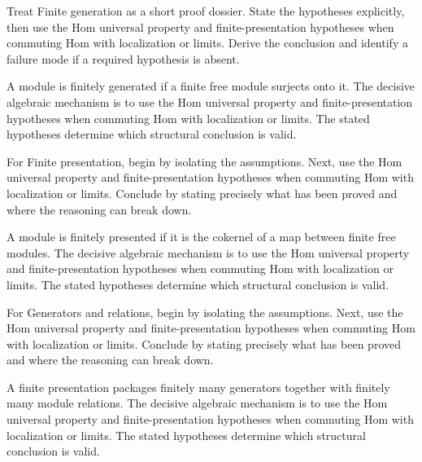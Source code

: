 \begin{problem}\label{prob:v12-problem-04}
Treat Finite generation as a short proof dossier. State the hypotheses explicitly, then use the Hom universal property and finite-presentation hypotheses when commuting Hom with localization or limits. Derive the conclusion and identify a failure mode if a required hypothesis is absent.
\end{problem}
\begin{solution}
A module is finitely generated if a finite free module surjects onto it. The decisive algebraic mechanism is to use the Hom universal property and finite-presentation hypotheses when commuting Hom with localization or limits. The stated hypotheses determine which structural conclusion is valid.
\end{solution}

\begin{problem}\label{prob:v12-problem-05}
For Finite presentation, begin by isolating the assumptions. Next, use the Hom universal property and finite-presentation hypotheses when commuting Hom with localization or limits. Conclude by stating precisely what has been proved and where the reasoning can break down.
\end{problem}
\begin{solution}
A module is finitely presented if it is the cokernel of a map between finite free modules. The decisive algebraic mechanism is to use the Hom universal property and finite-presentation hypotheses when commuting Hom with localization or limits. The stated hypotheses determine which structural conclusion is valid.
\end{solution}

\begin{problem}\label{prob:v12-problem-06}
For Generators and relations, begin by isolating the assumptions. Next, use the Hom universal property and finite-presentation hypotheses when commuting Hom with localization or limits. Conclude by stating precisely what has been proved and where the reasoning can break down.
\end{problem}
\begin{solution}
A finite presentation packages finitely many generators together with finitely many module relations. The decisive algebraic mechanism is to use the Hom universal property and finite-presentation hypotheses when commuting Hom with localization or limits. The stated hypotheses determine which structural conclusion is valid.
\end{solution}

